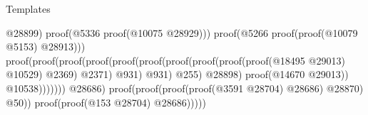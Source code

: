 \begin{lexlean}{Templates}
\begin{coremodule}
                                                                                          @28899)
                                                                                        proof(@5336
                                                                                            proof(@10075
                                                                                                @28929)))
                                                                                      proof(@5266
                                                                                          proof(proof(@10079
                                                                                                @5153)
                                                                                              @28913)))
                                                                                    proof(proof(proof(proof(proof(proof(proof(proof(proof(proof(@18495
                                                                                                          @29013)
                                                                                                        @10529)
                                                                                                      @2369)
                                                                                                    @2371)
                                                                                                  @931)
                                                                                                @931)
                                                                                              @255)
                                                                                            @28898)
                                                                                          proof(@14670
                                                                                              @29013))
                                                                                        @10538)))))))
                                                                @28686)
                                                              proof(proof(proof(proof(@3591 @28704)
                                                                      @28686)
                                                                    @28870)
                                                                  @50))
                                                            proof(proof(@153 @28704) @28686)))))

\end{coremodule}
\end{lexlean}
